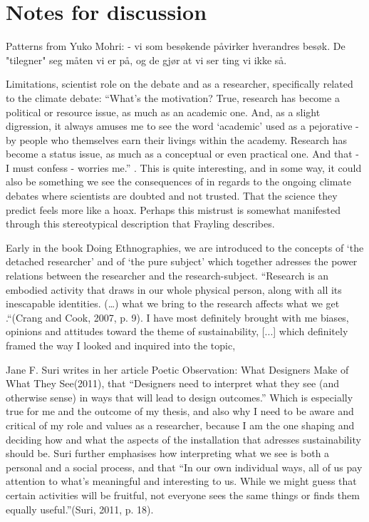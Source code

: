 \section{Notes for discussion}

Patterns from Yuko Mohri:
- vi som besøkende påvirker hverandres besøk. De "tilegner" seg måten vi er på, og de gjør at vi ser ting vi ikke så.



\par
Limitations, scientist role on the debate and as a researcher, specifically related to the climate debate:
“What’s the motivation? True, research has become a political or resource issue, as much as an academic one. And, as a slight digression, it always amuses me to see the word ‘academic’ used as a pejorative - by people who themselves earn their livings within the academy. Research has become a status issue, as much as a conceptual or even practical one. And that - I must confess - worries me.” \autocite[p. 5]{frayling_1994}. This is quite interesting, and in some way, it could also be something we see the consequences of in regards to the ongoing climate debates where scientists are doubted and not trusted. That the science they predict feels more like a hoax. Perhaps this mistrust is somewhat manifested through this stereotypical description that Frayling describes.
\par

\par
Early in the book Doing Ethnographies, we are introduced to the concepts of ‘the detached researcher’ and of ‘the pure subject’ which together adresses the power relations between the researcher and the research-subject. “Research is an embodied activity that draws in our whole physical person, along with all its inescapable identities. (…) what we bring to the research affects what we get .“(Crang and Cook, 2007, p. 9). I have most definitely brought with me biases, opinions and attitudes toward the theme of sustainability, [...] which definitely framed the way I looked and inquired into the topic,

Jane F. Suri writes in her article Poetic Observation: What Designers Make of What They See(2011), that “Designers need to interpret what they see (and otherwise sense) in ways that will lead to design outcomes.” Which is especially true for me and the outcome of my thesis, and also why I need to be aware and critical of my role and values as a researcher, because  I am the one shaping and deciding how and what the aspects of the installation that adresses sustainability should be. Suri further emphasises how interpreting what we see is both a personal and a social process, and that “In our own individual ways, all of us pay attention to what’s meaningful and interesting to us. While we might guess that certain activities will be fruitful, not everyone sees the same things or finds them equally useful.”(Suri, 2011, p. 18).
\par

